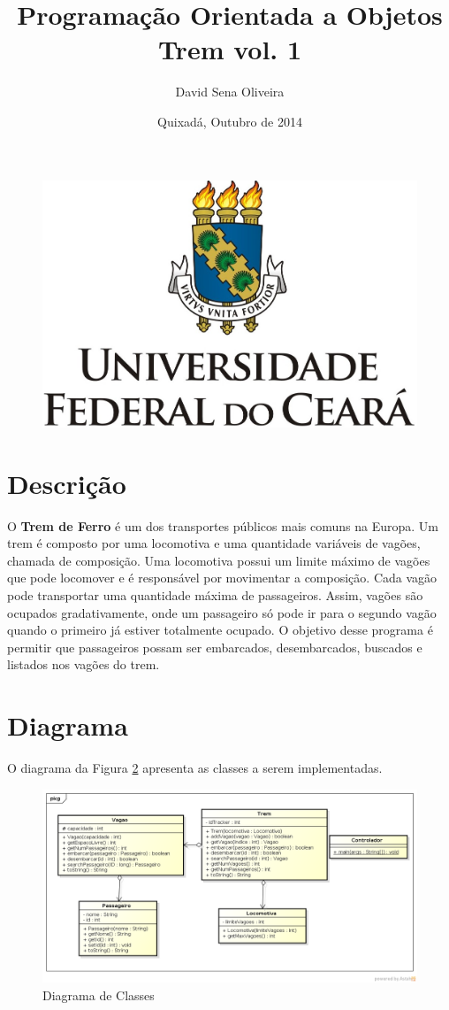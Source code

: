\documentclass[12pt]{article}
\title{Programação Orientada a Objetos \\ Trem vol. 1}
\author{David Sena Oliveira}
\date{Quixadá, Outubro de 2014}
\renewcommand{\bf}[1]{\textbf{#1}}
\begin{document}
\begin{figure}
\centering
\includegraphics[width=0.4\linewidth]{ufc}
\label{fig:ufc}
\end{figure}

\maketitle

\section{Descrição}

O \bf{Trem de Ferro} é um dos transportes públicos mais comuns na Europa. Um trem é composto por uma locomotiva e uma quantidade variáveis de vagões, chamada de composição. Uma locomotiva possui um limite máximo de vagões que pode locomover e é responsável por movimentar a composição. Cada vagão pode transportar uma quantidade máxima de passageiros. Assim, vagões são ocupados gradativamente, onde um passageiro só pode ir para o segundo vagão quando o primeiro já estiver totalmente ocupado. O objetivo desse programa é permitir que passageiros possam ser embarcados, desembarcados, buscados e listados nos vagões do trem.


\section{Diagrama}
O diagrama da Figura \ref{fig:diagrama} apresenta as classes a serem implementadas.
\begin{landscape}
\begin{figure}
\centering
\includegraphics[width=1\linewidth]{./diagrama}
\caption{Diagrama de Classes}
\label{fig:diagrama}
\end{figure}
\end{landscape}
\end{document}
